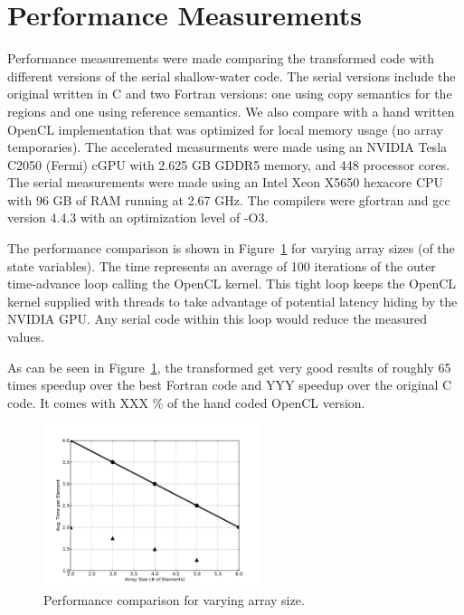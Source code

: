 \section{Performance Measurements}

Performance measurements were made comparing the transformed code with
different versions of the serial shallow-water code.  The serial
versions include the original written in C and two Fortran versions:
one using copy semantics for the regions and one using reference
semantics.  We also compare with a hand written OpenCL implementation
that was optimized for local memory usage (no array temporaries).  The
accelerated measurments were made using an NVIDIA Tesla C2050 (Fermi) cGPU with
2.625 GB GDDR5 memory, and 448 processor cores.  The serial
measurements were made using an Intel Xeon X5650 hexacore CPU with 96 GB of RAM
running at 2.67 GHz.  The compilers were gfortran and gcc version 4.4.3
with an optimization level of -O3.



The performance comparison is shown in Figure~\ref{fig:cl-performance} for
varying array sizes (of the state variables).  The time represents an average
of 100 iterations of the outer time-advance loop calling the OpenCL kernel.
This tight loop keeps the OpenCL kernel supplied with threads to take
advantage of potential latency hiding by the NVIDIA GPU.  Any serial code
within this loop would reduce the measured values.

As can be seen in Figure~\ref{fig:cl-performance}, the transformed get very
good results of roughly 65 times speedup over the best Fortran code and YYY
speedup over the original C code.  It comes with XXX \% of the hand coded
OpenCL version.

\begin{figure}[!t]
\centering
\includegraphics[width=2.5in]{cl-performance.pdf}
\caption{Performance comparison for varying array size.}
\label{fig:cl-performance}
\end{figure}
